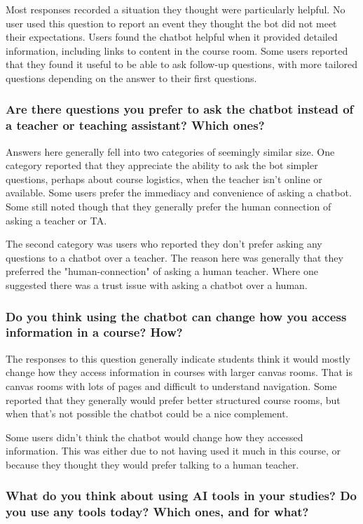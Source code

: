 Most responses recorded a situation they thought were particularly helpful. No user used this question to report an event they thought the bot did not meet their expectations. Users found the chatbot helpful when it provided detailed information, including links to content in the course room. Some users reported that they found it useful to be able to ask follow-up questions, with more tailored questions depending on the answer to their first questions.


\subsubsection{Are there questions you prefer to ask the chatbot instead of a teacher or teaching assistant? Which ones?}


Answers here generally fell into two categories of seemingly similar size. One category reported that they appreciate the ability to ask the bot simpler questions, perhaps about course logistics, when the teacher isn’t online or available. Some users prefer the immediacy and convenience of asking a chatbot. Some still noted though that they generally prefer the human connection of asking a teacher or TA.


The second category was users who reported they don’t prefer asking any questions to a chatbot over a teacher. The reason here was generally that they preferred the "human-connection" of asking a human teacher. Where one suggested there was a trust issue with asking a chatbot over a human.


\subsubsection{Do you think using the chatbot can change how you access information in a course? How?}


The responses to this question generally indicate students think it would mostly change how they access information in courses with larger canvas rooms. That is canvas rooms with lots of pages and difficult to understand navigation. Some reported that they generally would prefer better structured course rooms, but when that’s not possible the chatbot could be a nice complement.


Some users didn’t think the chatbot would change how they accessed information. This was either due to not having used it much in this course, or because they thought they would prefer talking to a human teacher.


\subsubsection{What do you think about using AI tools in your studies? Do you use any tools today? Which ones, and for what?}


